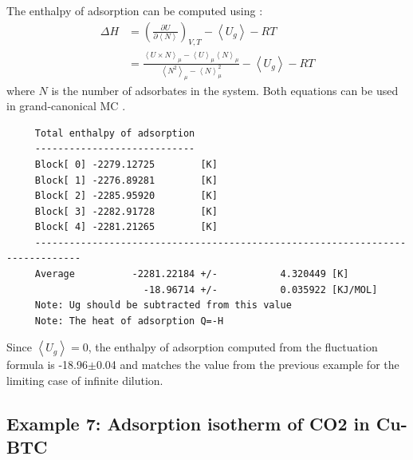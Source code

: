 \noindent
The enthalpy of adsorption can be computed using \cite{Karavias1991,Snurr1993,Vlugt2008}:
\begin{align}
 \Delta H &= \left(\frac{\partial U}{\partial \left\langle N\right\rangle}\right)_{V,T}-
             \left\langle U_g \right\rangle - RT\\
  &=\frac{\left\langle U \times N\right\rangle_\mu - \left\langle U\right\rangle_\mu\left\langle N\right\rangle_\mu}
                {\left\langle N^2\right\rangle_\mu - \left\langle N\right\rangle_\mu^2 }
              - \left\langle U_g \right\rangle - RT\label{Eq: fluctuation formula}
\end{align}
where $N$ is the number of adsorbates in the system.
Both equations can be used in grand-canonical MC \cite{Snurr1993}.
\begin{tiny}
\begin{verbatim}
     Total enthalpy of adsorption
     ----------------------------
     Block[ 0] -2279.12725        [K]
     Block[ 1] -2276.89281        [K]
     Block[ 2] -2285.95920        [K]
     Block[ 3] -2282.91728        [K]
     Block[ 4] -2281.21265        [K]
     ------------------------------------------------------------------------------
     Average          -2281.22184 +/-           4.320449 [K]
                        -18.96714 +/-           0.035922 [KJ/MOL]
     Note: Ug should be subtracted from this value
     Note: The heat of adsorption Q=-H
\end{verbatim}
\end{tiny}
Since $\left\langle U_g \right\rangle=0$, the enthalpy of adsorption computed from the fluctuation formula
is -18.96$\pm$0.04 and matches the value from the previous example for the limiting case of infinite dilution.

\subsection*{Example 7: Adsorption isotherm of CO2 in Cu-BTC}

